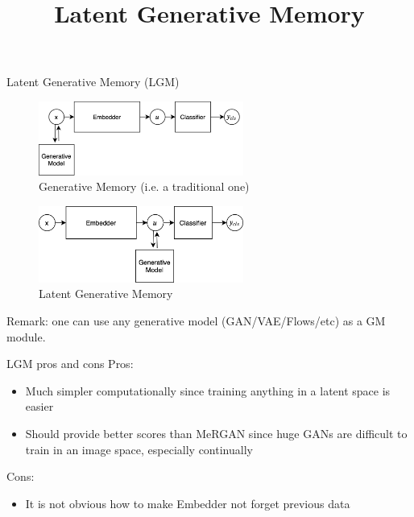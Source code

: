 \documentclass[handout, 10pt]{beamer}
\title{Latent Generative Memory}
\begin{document}
\begin{frame}
    \titlepage
\end{frame}


\begin{frame}{Latent Generative Memory (LGM)}
    \pause
    \begin{figure}
        \centering
        \includegraphics[width=0.6\textwidth]{images/GM}
        \caption{Generative Memory (i.e. a traditional one)}
    \end{figure}
    
    \pause
    \begin{figure}
        \centering
        \includegraphics[width=0.6\textwidth]{images/LGM}
        \caption{Latent Generative Memory}
    \end{figure}
    
    \pause
    Remark: one can use any generative model (GAN/VAE/Flows/etc) as a GM module.
\end{frame}


\begin{frame}{LGM pros and cons}
    \pause Pros:
    \begin{itemize}
        \item\pause Much simpler computationally since training anything in a latent space is easier
        \item\pause Should provide better scores than MeRGAN since huge GANs are difficult to train in an image space, especially continually
    \end{itemize}
    
    \pause Cons:
    \begin{itemize}
        \item\pause It is not obvious how to make Embedder not forget previous data
    \end{itemize}
\end{frame}
\end{document}
